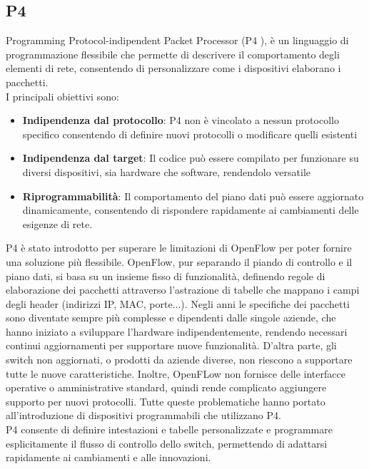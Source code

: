 \subsection{P4}
Programming Protocol-indipendent Packet Processor (P4 \cite{p4}), è un linguaggio di programmazione flessibile
che permette di descrivere il comportamento degli elementi di rete, consentendo di personalizzare come i dispositivi elaborano i pacchetti.
\\I principali obiettivi sono:
\begin{itemize}
    \item \textbf{Indipendenza dal protocollo}: P4 non è vincolato a nessun protocollo specifico consentendo di definire nuovi protocolli o modificare quelli esistenti
    \item \textbf{Indipendenza dal target}: Il codice può essere compilato per funzionare su diversi dispositivi, sia hardware che software, rendendolo versatile
    \item \textbf{Riprogrammabilità}: Il comportamento del piano dati può essere aggiornato dinamicamente, consentendo di rispondere rapidamente ai cambiamenti delle esigenze di rete.
\end{itemize}
P4 è stato introdotto per superare le limitazioni di OpenFlow per poter fornire una soluzione più flessibile.
OpenFlow, pur separando il piando di controllo e il piano dati, si basa su un insieme fisso di funzionalità, definendo regole di elaborazione dei pacchetti attraverso l'astrazione di tabelle che mappano i campi degli header (indirizzi IP, MAC, porte...). 
Negli anni le specifiche dei pacchetti sono diventate sempre più complesse e dipendenti dalle singole aziende, che hanno iniziato a sviluppare l'hardware indipendentemente, rendendo necessari continui aggiornamenti per supportare nuove funzionalità\cite{p4art}.
D'altra parte, gli switch non aggiornati, o prodotti da aziende diverse, non riescono a supportare tutte le nuove caratteristiche.
Inoltre, OpenFLow non fornisce delle interfacce operative o amministrative standard, quindi rende complicato aggiungere supporto per nuovi protocolli.
Tutte queste problematiche hanno portato all'introduzione di dispositivi programmabili che utilizzano P4.
\\P4 consente di definire intestazioni e tabelle personalizzate e programmare esplicitamente il flusso di controllo dello switch, permettendo di adattarsi rapidamente ai cambiamenti e alle innovazioni.
